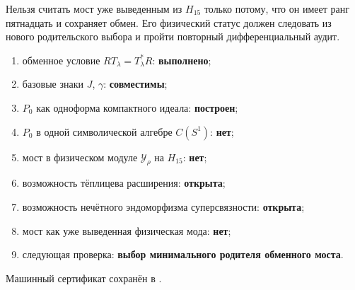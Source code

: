 \begin{nogocriterion}
Нельзя считать мост уже выведенным из $H_{15}$ только потому, что он имеет
ранг пятнадцать и сохраняет обмен. Его физический статус должен следовать
из нового родительского выбора и пройти повторный дифференциальный аудит.
\end{nogocriterion}

\begin{protocol}
\begin{enumerate}
 \item обменное условие $RT_\lambda=T_\lambda^*R$: \textbf{выполнено};
 \item базовые знаки $J$, $\gamma$: \textbf{совместимы};
 \item $P_0$ как одноформа компактного идеала: \textbf{построен};
 \item $P_0$ в одной символической алгебре $C(S^1)$: \textbf{нет};
 \item мост в физическом модуле $\mathcal Y_\rho$ на $H_{15}$:
 \textbf{нет};
 \item возможность тёплицева расширения: \textbf{открыта};
 \item возможность нечётного эндоморфизма суперсвязности:
 \textbf{открыта};
 \item мост как уже выведенная физическая мода: \textbf{нет};
 \item следующая проверка:
 \textbf{выбор минимального родителя обменного моста}.
\end{enumerate}
\end{protocol}

Машинный сертификат сохранён в
.